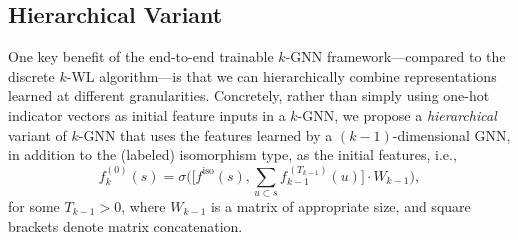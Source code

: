 \documentclass[letterpaper]{article}
\theoremstyle{definition}
\begin{document}
\subsection{Hierarchical Variant}

One key benefit of the end-to-end trainable $k$-GNN frame\-work---compared to the discrete $k$-WL algorithm---is that we can hierarchically combine representations learned at different granularities.
Concretely, rather than simply using one-hot indicator vectors as initial feature inputs in a $k$-GNN, we propose a \emph{hierarchical} variant of $k$-GNN that uses the features learned by a $(k-1)$-dimensional GNN, in addition to the (labeled) isomorphism type, as the initial features, i.e.,
\begin{equation*}
	f^{(0)}_{k}(s) =  \sigma \Big(\Big[f^{\text{iso}}(s), \sum_{u \subset s} f^{\,(T_{k-1})}_{k-1}(u) \Big] \cdot W_{k-1} \Big),
\end{equation*}
for some $T_{k-1} > 0$, where $W_{k-1}$ is a matrix of appropriate size, and square brackets denote matrix concatenation. 
\end{document}
